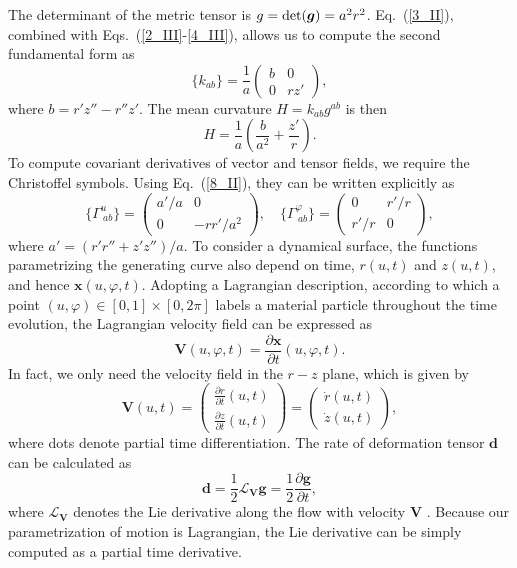 The determinant of the metric tensor is  $g=\textup{det}(\bm{g}) = a^2 r^2$. Eq.~(\ref{3_II}), combined with Eqs.~(\ref{2_III}-\ref{4_III}), allows us to compute the second fundamental form as
\begin{equation} \label{6_III}
   \{k_{ab}\}= \frac{1}{a}\begin{pmatrix}
b & 0 \\ 
0 & r z'
\end{pmatrix},
\end{equation}
where $b=r'z''-r''z'$. The mean curvature  $H =k_{ab}g^{ab}$ is then
\begin{equation} \label{23_III}
	H  = \frac{1}{a}\left(\frac{b}{a^2} + \frac{z'}{r}\right).  
\end{equation}
 To compute covariant derivatives of vector and tensor fields, we require the Christoffel symbols. Using Eq.~(\ref{8_II}), they can be written explicitly as
\begin{equation} \label{7_III}
\{\Gamma^u_{~ab}\} =  \begin{pmatrix}
a'/a &0 \\ 
0 &-rr'/a^2 
\end{pmatrix}  , \quad \{\Gamma^\varphi_{~ab}\} =   \begin{pmatrix}
0 &r'/r \\ 
r'/r &0 
\end{pmatrix} ,
\end{equation}
where $a' = (r' r''+z'z'')/a $.
To consider a dynamical surface, the functions parametrizing the generating curve also depend on time, $r(u,t)$ and $z(u,t)$, and hence $\bm{x}(u,\varphi,t)$. Adopting a Lagrangian description, according to which a point $(u,\varphi)\in [0,1]\times[0,2\pi]$ labels a material particle throughout the time evolution, the Lagrangian velocity field can be expressed as 
\begin{equation}   \label{8_III}
     \bm{V}(u,\varphi,t) = \frac{\partial \bm{x}}{\partial t} (u,\varphi,t).
\end{equation}
In fact, we only need the velocity field in the $r-z$ plane, which is given by 
\begin{equation}   \label{8_III}
     \bm{V}(u,t) = \begin{pmatrix}
     	\frac{\partial r}{\partial t} (u,t)\\ 
     	\frac{\partial z}{\partial t} (u,t)
     \end{pmatrix} 
     = 
     \begin{pmatrix}
     	\dot{r} (u,t)\\ 
     	\dot{z} (u,t)
     \end{pmatrix}, 
\end{equation}
where dots denote partial time differentiation. The rate of deformation tensor $\bm{d}$ can be calculated as
\begin{equation}  \label{11_III}
\bm{d} = \frac{1}{2} \mathcal{L}_{\bm{V}} \bm{g}= \frac{1}{2} \frac{\partial  \bm{g}}{\partial t}, 
\end{equation}
where $\mathcal{L}_{\bm{V}}$ denotes the Lie derivative along the flow with velocity $\bm{V}$ \cite{marsden1994}. Because our parametrization of motion is Lagrangian, the Lie derivative can be simply computed as a partial time derivative. 

